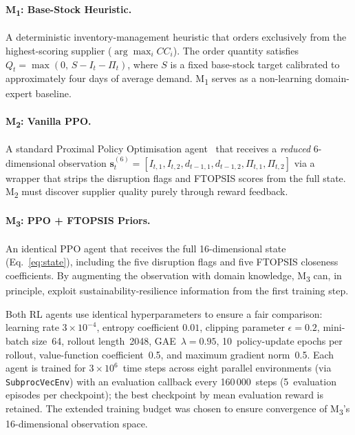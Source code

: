 \documentclass[preprint,12pt]{elsarticle}
\begin{document}
\paragraph{M\textsubscript{1}: Base-Stock Heuristic.}
A deterministic inventory-management heuristic that orders exclusively from the highest-scoring supplier ($\arg\max_i CC_i$). The order quantity satisfies
$Q_t = \max(0,\,S - I_t - \Pi_t)$,
where $S$ is a fixed base-stock target calibrated to approximately four days of average demand. M\textsubscript{1} serves as a non-learning domain-expert baseline.

\paragraph{M\textsubscript{2}: Vanilla PPO.}
A standard Proximal Policy Optimisation agent~\citep{Schulman_etal_2017} that receives a \emph{reduced} 6-dimensional observation $\mathbf{s}_t^{(6)} = [I_{t,1},I_{t,2},d_{t-1,1},d_{t-1,2},\Pi_{t,1},\Pi_{t,2}]$ via a wrapper that strips the disruption flags and FTOPSIS scores from the full state. M\textsubscript{2} must discover supplier quality purely through reward feedback.

\paragraph{M\textsubscript{3}: PPO + FTOPSIS Priors.}
An identical PPO agent that receives the full 16-dimensional state (Eq.~\ref{eq:state}), including the five disruption flags and five FTOPSIS closeness coefficients. By augmenting the observation with domain knowledge, M\textsubscript{3} can, in principle, exploit sustainability-resilience information from the first training step.

Both RL agents use identical hyperparameters to ensure a fair comparison: learning rate $3\!\times\!10^{-4}$, entropy coefficient $0.01$, clipping parameter $\epsilon=0.2$, mini-batch size~64, rollout length~2048, GAE~$\lambda=0.95$, 10~policy-update epochs per rollout, value-function coefficient~0.5, and maximum gradient norm~0.5.
Each agent is trained for $3\!\times\!10^6$~time steps across eight parallel environments (via \texttt{SubprocVecEnv}) with an evaluation callback every 160\,000~steps (5~evaluation episodes per checkpoint); the best checkpoint by mean evaluation reward is retained.
The extended training budget was chosen to ensure convergence of M\textsubscript{3}'s 16-dimensional observation space.
\end{document}
